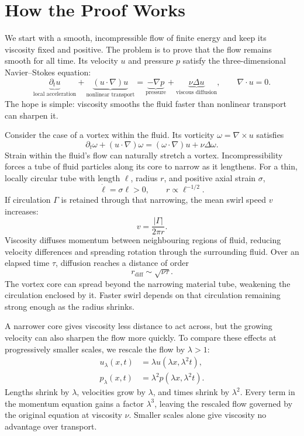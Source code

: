 \begingroup
\setlength{\parindent}{0pt}
\setlength{\parskip}{0.40\baselineskip}
\setlength{\abovedisplayskip}{6.5pt plus 1.5pt minus 1.5pt}
\setlength{\belowdisplayskip}{6.5pt plus 1.5pt minus 1.5pt}
\setlength{\jot}{5pt}

\section*{How the Proof Works}

We start with a smooth, incompressible flow of finite energy and keep its
viscosity fixed and positive. The problem is to prove that the flow remains
smooth for all time. Its velocity \(u\) and pressure \(p\) satisfy the
three-dimensional Navier--Stokes equation:
\[
 \underbrace{\partial_tu}_{\text{local acceleration}}
 +\underbrace{(u\!\cdot\nabla)u}_{\text{nonlinear transport}}
 =\underbrace{-\nabla p}_{\text{pressure}}
 +\underbrace{\nu\Delta u}_{\text{viscous diffusion}},
 \qquad \nabla\!\cdot u=0.
\]
The hope is simple: viscosity smooths the fluid faster than nonlinear
transport can sharpen it.

Consider the case of a vortex within the fluid. Its vorticity
\(\omega=\nabla\times u\) satisfies
\[
 \partial_t\omega+(u\cdot\nabla)\omega
 =(\omega\cdot\nabla)u+\nu\Delta\omega.
\]
Strain within the fluid's flow can naturally stretch a vortex.
Incompressibility forces a tube of fluid particles along its core to narrow
as it lengthens. For a thin, locally circular tube with length \(\ell\),
radius \(r\), and positive axial strain \(\sigma\),
\[
 \dot\ell=\sigma\ell>0,
 \qquad r\propto\ell^{-1/2}.
\]
If circulation \(\Gamma\) is retained through that narrowing, the mean
swirl speed \(v\) increases:
\[
 v=\frac{|\Gamma|}{2\pi r}.
\]
Viscosity diffuses momentum between neighbouring regions of fluid, reducing
velocity differences and spreading rotation through the surrounding fluid.
Over an elapsed time \(\tau\), diffusion reaches a distance of order
\[
 r_{\mathrm{diff}}\sim\sqrt{\nu\tau}.
\]
The vortex core can spread beyond the narrowing material tube, weakening
the circulation enclosed by it. Faster swirl depends on that circulation
remaining strong enough as the radius shrinks.

A narrower core gives viscosity less distance to act across, but the
growing velocity can also sharpen the flow more quickly. To compare these
effects at progressively smaller scales, we rescale the flow by
\(\lambda>1\):
\[
 \begin{aligned}
 u_\lambda(x,t)&=\lambda u(\lambda x,\lambda^2t),\\
 p_\lambda(x,t)&=\lambda^2p(\lambda x,\lambda^2t).
 \end{aligned}
\]
Lengths shrink by \(\lambda\), velocities grow by \(\lambda\), and times
shrink by \(\lambda^2\). Every term in the momentum equation gains a
factor \(\lambda^3\), leaving the rescaled flow governed by the original
equation at viscosity \(\nu\). Smaller scales alone give viscosity no
advantage over transport.

